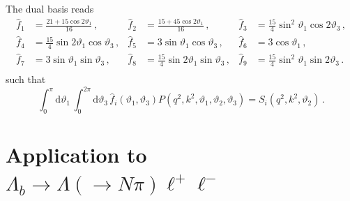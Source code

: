 \documentclass[aps,prd,reprint,nofootinbib,preprintnumbers]{revtex4}
\newcommand{\rmdx}[1]{\mbox{d} #1 \,} %
\renewcommand{\theta}{\vartheta}
\begin{document}
The dual basis reads
\begin{equation}
\begin{aligned}
    \hat{f}_1 & = \frac{21 + 15 \cos 2\theta_1}{16}\,, &
    \hat{f}_2 & = \frac{15 + 45 \cos 2\theta_1}{16}\,, &
    \hat{f}_3 & = \frac{15}{4} \sin^2\theta_1 \cos 2\theta_3     \,,\\
    \hat{f}_4 & = \frac{15}{4} \sin 2\theta_1 \cos  \theta_3     \,, &
    \hat{f}_5 & = 3            \sin  \theta_1 \cos  \theta_3     \,, &
    \hat{f}_6 & = 3 \cos\theta_1                   \,,\\
    \hat{f}_7 & = 3            \sin  \theta_1 \sin  \theta_3     \,, &
    \hat{f}_8 & = \frac{15}{4} \sin 2\theta_1 \sin  \theta_3     \,, &
    \hat{f}_9 & = \frac{15}{4} \sin^2\theta_1 \sin 2\theta_3     \,.\\
\end{aligned}
\end{equation}
such that
\begin{equation}
    \int_0^\pi \rmdx{\theta_1} \int_0^{2\pi} \rmdx{\theta_3} \hat{f}_i(\theta_1,\theta_3) P(q^2, k^2, \theta_1,\theta_2,\theta_3) = S_i(q^2, k^2, \theta_2)\,.
\end{equation}


\section{Application to $\Lambda_b\to \Lambda(\to N \pi)\ell^+\ell^-$}
\label{app:lambdabtolambdall}
\end{document}
